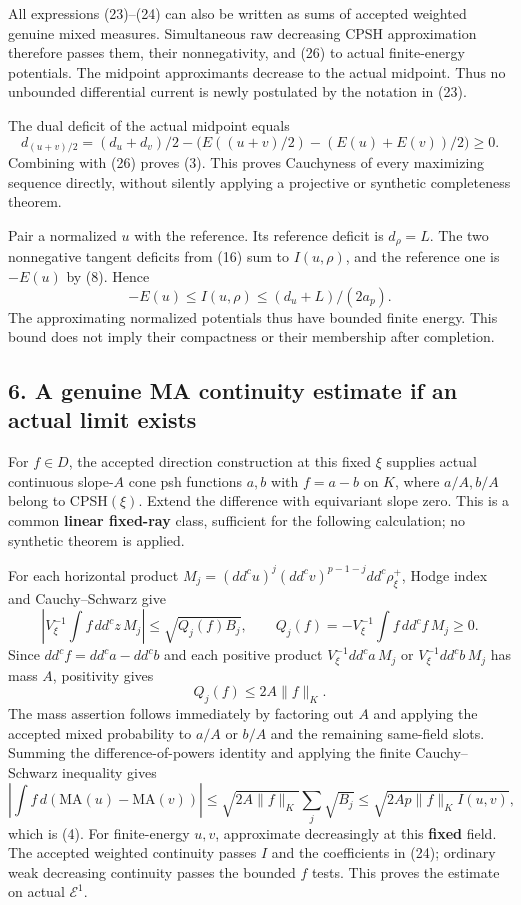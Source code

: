 \documentclass[
  10pt,
]{article}
\begin{document}
All expressions (23)--(24) can also be written as sums of accepted
weighted genuine mixed measures. Simultaneous raw decreasing CPSH
approximation therefore passes them, their nonnegativity, and (26) to
actual finite-energy potentials. The midpoint approximants decrease to
the actual midpoint. Thus no unbounded differential current is newly
postulated by the notation in (23).

The dual deficit of the actual midpoint equals \[
 d_{(u+v)/2}=(d_u+d_v)/2-
               \big(E((u+v)/2)-(E(u)+E(v))/2\big)\geq0.
\] Combining with (26) proves (3). This proves Cauchyness of every
maximizing sequence directly, without silently applying a projective or
synthetic completeness theorem.

Pair a normalized \(u\) with the reference. Its reference deficit is
\(d_\rho=L\). The two nonnegative tangent deficits from (16) sum to
\(I(u,\rho)\), and the reference one is \(-E(u)\) by (8). Hence \[
                   -E(u)\leq I(u,\rho)
                    \leq (d_u+L)/(2a_p).                             \tag{27}
\] The approximating normalized potentials thus have bounded finite
energy. This bound does not imply their compactness or their membership
after completion.

\subsection{6. A genuine MA continuity estimate if an actual limit
exists}\label{a-genuine-ma-continuity-estimate-if-an-actual-limit-exists}

For \(f\in D\), the accepted direction construction at this fixed
\(\xi\) supplies actual continuous slope-\(A\) cone psh functions
\(a,b\) with \(f=a-b\) on \(K\), where \(a/A,b/A\) belong to
CPSH\((\xi)\). Extend the difference with equivariant slope zero. This
is a common \textbf{linear fixed-ray} class, sufficient for the
following calculation; no synthetic theorem is applied.

For each horizontal product
\(M_j=(dd^cu)^j(dd^cv)^{p-1-j}dd^c\rho_\xi^+\), Hodge index and
Cauchy--Schwarz give \[
 \left|V_\xi^{-1}\int f\,dd^cz\,M_j\right|\leq\sqrt{Q_j(f)B_j},
 \qquad Q_j(f)=-V_\xi^{-1}\int f\,dd^cf\,M_j\geq0.
\] Since \(dd^cf=dd^ca-dd^cb\) and each positive product
\(V_\xi^{-1}dd^ca\,M_j\) or \(V_\xi^{-1}dd^cb\,M_j\) has mass \(A\),
positivity gives \[
                         Q_j(f)\leq2A\|f\|_K.                       \tag{28}
\] The mass assertion follows immediately by factoring out \(A\) and
applying the accepted mixed probability to \(a/A\) or \(b/A\) and the
remaining same-field slots. Summing the difference-of-powers identity
and applying the finite Cauchy--Schwarz inequality gives \[
 \left|\int f\,d(\mathrm{MA}(u)-\mathrm{MA}(v))\right|
 \leq\sqrt{2A\|f\|_K}\sum_j\sqrt{B_j}
 \leq\sqrt{2Ap\|f\|_K I(u,v)},
\] which is (4). For finite-energy \(u,v\), approximate decreasingly at
this \textbf{fixed} field. The accepted weighted continuity passes \(I\)
and the coefficients in (24); ordinary weak decreasing continuity passes
the bounded \(f\) tests. This proves the estimate on actual
\(\mathcal E^1\).
\end{document}
